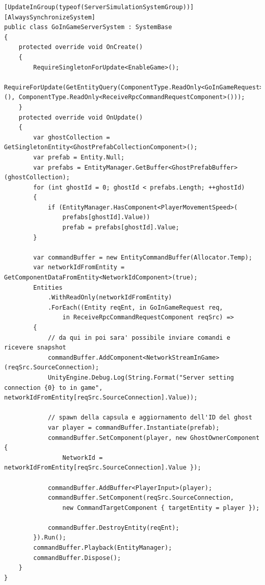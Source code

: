 \begin{lstlisting}[caption={File \UseVerb{GameTerm}: ricezione della RPC e avvio della comunicazione con il server, tramite stream di comandi e snapshot.}, label={lst:prototipo-game-start-server}, language={[Sharp]C}]
[UpdateInGroup(typeof(ServerSimulationSystemGroup))]
[AlwaysSynchronizeSystem]
public class GoInGameServerSystem : SystemBase
{
    protected override void OnCreate()
    {
        RequireSingletonForUpdate<EnableGame>();
        RequireForUpdate(GetEntityQuery(ComponentType.ReadOnly<GoInGameRequest>(), ComponentType.ReadOnly<ReceiveRpcCommandRequestComponent>()));
    }
    protected override void OnUpdate()
    {
        var ghostCollection = GetSingletonEntity<GhostPrefabCollectionComponent>();
        var prefab = Entity.Null;
        var prefabs = EntityManager.GetBuffer<GhostPrefabBuffer>(ghostCollection);
        for (int ghostId = 0; ghostId < prefabs.Length; ++ghostId)
        {
            if (EntityManager.HasComponent<PlayerMovementSpeed>(
                prefabs[ghostId].Value))
                prefab = prefabs[ghostId].Value;
        }

        var commandBuffer = new EntityCommandBuffer(Allocator.Temp);
        var networkIdFromEntity = GetComponentDataFromEntity<NetworkIdComponent>(true);
        Entities
            .WithReadOnly(networkIdFromEntity)
            .ForEach((Entity reqEnt, in GoInGameRequest req, 
                in ReceiveRpcCommandRequestComponent reqSrc) =>
        {
            // da qui in poi sara' possibile inviare comandi e ricevere snapshot
            commandBuffer.AddComponent<NetworkStreamInGame>(reqSrc.SourceConnection);
            UnityEngine.Debug.Log(String.Format("Server setting connection {0} to in game", networkIdFromEntity[reqSrc.SourceConnection].Value));

			// spawn della capsula e aggiornamento dell'ID del ghost
            var player = commandBuffer.Instantiate(prefab);
            commandBuffer.SetComponent(player, new GhostOwnerComponent { 
                NetworkId = networkIdFromEntity[reqSrc.SourceConnection].Value });

            commandBuffer.AddBuffer<PlayerInput>(player);
            commandBuffer.SetComponent(reqSrc.SourceConnection, 
                new CommandTargetComponent { targetEntity = player });

            commandBuffer.DestroyEntity(reqEnt);
        }).Run();
        commandBuffer.Playback(EntityManager);
        commandBuffer.Dispose();
    }
}
\end{lstlisting}

